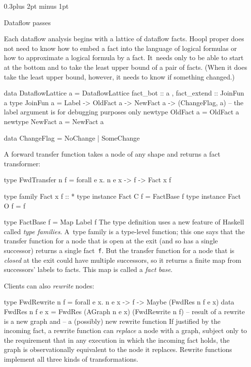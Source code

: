 \documentclass[twocolumn]{article}
\makeatletter
\newenvironment{code}{\par\unskip\kern-6pt \small\verbatim}{\endverbatim}
\newenvironment{smallcode}{\par\unskip\footnotesize\verbatim}{\endverbatim}
\newcommand\mysection[1]{%
  \par
  \vskip 0.5\baselineskip plus 2pt minus 1pt
  \noindent{\raggedright\textbf{#1}}
  \par
  \vskip 0.3\baselineskip plus 2pt minus 1pt
  \@afterindentfalse
}
\renewcommand\mysection[1]{%
  \@startsection{section}{1}{\z@}{-0.5\baselineskip plus -2pt minus -1pt}%
                                   {0.3\baselineskip plus 2pt minus 1pt}%
           {\normalfont\raggedright\bfseries}}
\makeatother
\begin{document}
\mysection*{Dataflow passes}

Each dataflow analysis begins with a lattice of dataflow facts.
Hoopl proper does not need to know how to embed a fact into the
language of logical formulas or how to approximate a logical formula
by a fact.
It~needs only to be able to start at the bottom and to take the least
upper bound of a pair of facts.
(When it does take the least upper bound, however, it needs to know if
something changed.)
\begin{smallcode}
data DataflowLattice a = DataflowLattice  
 { fact_bot        :: a
 , fact_extend     :: JoinFun a
 }
type JoinFun a
  = Label -> OldFact a -> NewFact a -> (ChangeFlag, a)
  -- the label argument is for debugging purposes only
newtype OldFact a = OldFact a
newtype NewFact a = NewFact a

data ChangeFlag = NoChange | SomeChange
\end{smallcode}

A forward transfer function takes a node of any shape and returns a
fact transformer:
\begin{code}
type FwdTransfer n f 
  = forall e x. n e x -> f -> Fact x f 

type family   Fact x f :: *
type instance Fact C f = FactBase f
type instance Fact O f = f

type FactBase f = Map Label f
\end{code}
The type definition uses a new feature of Haskell called \emph{type
  families}.
A~type family is a type-level function; this one says that the
  transfer function for a node that is open at the exit (and so has a
  single successor) returns a single fact~\texttt{f}.
But the transfer function for a node that is \emph{closed} at the exit
  could have multiple successors, so it returns a finite map from
  successors' labels to facts.
This map is called a \emph{fact base}.

Clients can also \emph{rewrite} nodes:
\begin{smallcode}
type FwdRewrite n f 
  = forall e x. n e x -> f -> Maybe (FwdRes n f e x)
data FwdRes n f e x = FwdRes (AGraph n e x) (FwdRewrite n f)
  -- result of a rewrite is a new graph and 
  -- a (possibly) new rewrite function
\end{smallcode}
If justified by the incoming fact, a rewrite function can
\emph{replace} a node with a graph, subject only to the requirement
that in any execution in which the incoming fact holds, the graph is
observationally equivalent to the node it replaces.
Rewrite functions implement all three kinds of transformations.
\end{document}
